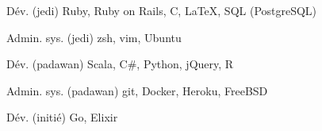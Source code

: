 
\begin{cvskills}

  \cvskill
    {Dév. (jedi)} %
    {Ruby, Ruby on Rails, C, LaTeX, SQL (PostgreSQL)} %

  \cvskill
    {Admin. sys. (jedi)} %
    {zsh, vim, Ubuntu} %

  \cvskill
    {Dév. (padawan)} %
    {Scala, C\#, Python, jQuery, R} %

  \cvskill
    {Admin. sys. (padawan)} %
    {git, Docker, Heroku, FreeBSD} %

  \cvskill
    {Dév. (initié)} %
    {Go, Elixir} %
\end{cvskills}
